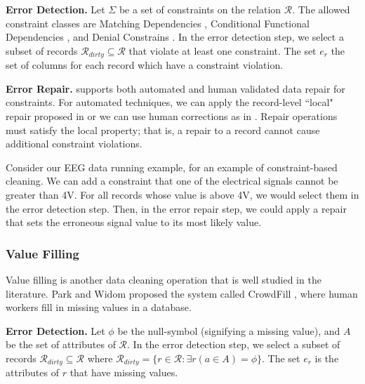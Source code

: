 \vspace{0.5em}

\noindent\textbf{Error Detection. } Let $\Sigma$ be a set of constraints on the relation $\mathcal{R}$. 
The allowed constraint classes are Matching Dependencies \cite{bertossi2013data}, Conditional Functional Dependencies \cite{DBLP:journals/pvldb/FanLMTY10}, and Denial Constrains \cite{khayyat2015bigdansing}. 
In the error detection step, we select a subset of records $\mathcal{R}_{dirty} \subseteq \mathcal{R}$ that violate at least one constraint.
The set $e_r$ the set of columns for each record which have a constraint violation.

\vspace{0.5em}

\noindent\textbf{Error Repair. } \sys supports both automated and human validated data repair for constraints. For automated techniques, we can apply the record-level ``local" repair proposed in \cite{DBLP:journals/pvldb/FanLMTY10} or we can use human corrections as in \cite{DBLP:journals/pvldb/YakoutENOI11}. Repair operations must satisfy the local property; that is, a repair to a record cannot cause additional constraint violations.

\begin{example}
Consider our EEG data running example, for an example of constraint-based cleaning.
We can add a constraint that one of the electrical signals cannot be greater than 4V.
For all records whose value is above 4V, we would select them in the error detection step.
Then, in the error repair step, we could apply a repair that sets the erroneous signal value to its most likely value.
\end{example}

\subsubsection{Value Filling}
Value filling is another data cleaning operation that is well studied in the literature.
Park and Widom proposed the system called CrowdFill \cite{park2014crowdfill}, where human workers fill in missing values in a database.

\vspace{0.5em}

\noindent\textbf{Error Detection. } Let $\phi$ be the null-symbol (signifying a missing value), and $A$ be the set of attributes of $\mathcal{R}$. In the error detection step, we select a subset of records $\mathcal{R}_{dirty} \subseteq \mathcal{R}$ where $\mathcal{R}_{dirty}=\{r \in \mathcal{R}: \exists r(a\in A) = \phi \}$.
The set $e_r$ is the attributes of $r$ that have missing values.

